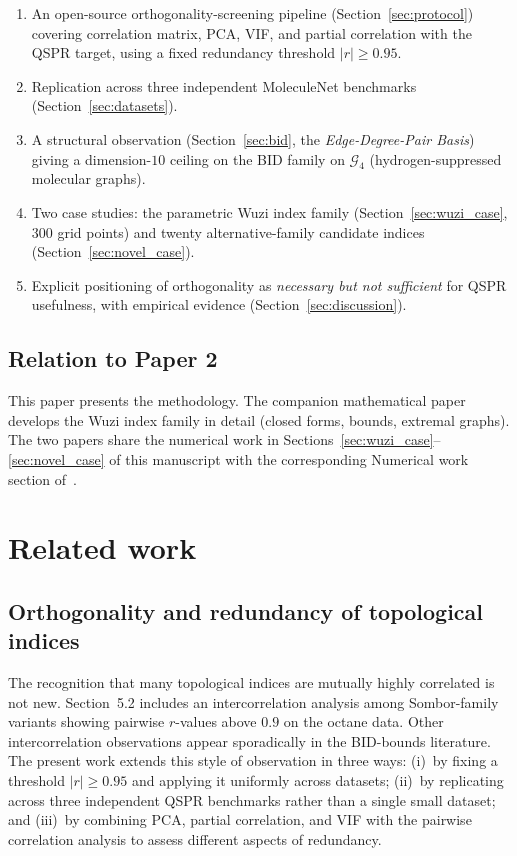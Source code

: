 \documentclass[11pt,a4paper]{article}
\theoremstyle{definition}
\begin{document}
\begin{enumerate}[label=(\arabic*)]
\item An open-source orthogonality-screening pipeline
(Section~\ref{sec:protocol}) covering correlation matrix,
PCA, VIF, and partial correlation with the QSPR target, using
a fixed redundancy threshold $|r|\ge 0.95$.
\item Replication across three independent MoleculeNet
benchmarks (Section~\ref{sec:datasets}).
\item A structural observation (Section~\ref{sec:bid}, the
\emph{Edge-Degree-Pair Basis}) giving a dimension-$10$ ceiling on
the BID family on $\mathcal{G}_4$ (hydrogen-suppressed molecular
graphs).
\item Two case studies: the parametric Wuzi index family
(Section~\ref{sec:wuzi_case}, $300$ grid points) and twenty
alternative-family candidate indices
(Section~\ref{sec:novel_case}).
\item Explicit positioning of orthogonality as \emph{necessary but
not sufficient} for QSPR usefulness, with empirical evidence
(Section~\ref{sec:discussion}).
\end{enumerate}

\subsection{Relation to Paper 2}
This paper presents the methodology. The companion mathematical
paper~\cite{Paper2_Wuzi} develops the Wuzi index family in detail
(closed forms, bounds, extremal graphs). The two papers share the
numerical work in Sections~\ref{sec:wuzi_case}--\ref{sec:novel_case}
of this manuscript with the corresponding Numerical work section
of~\cite{Paper2_Wuzi}.

\section{Related work}\label{sec:related}

\subsection{Orthogonality and redundancy of topological indices}

The recognition that many topological indices are mutually highly
correlated is not new. \cite{MovahediGutmanRedzepovicFurtula2026}
Section~5.2 includes an intercorrelation analysis among
Sombor-family variants showing pairwise $r$-values above $0.9$ on
the octane data. Other intercorrelation observations appear
sporadically in the BID-bounds literature. The present work
extends this style of observation in three ways: (i)~by fixing a
threshold $|r|\ge 0.95$ and applying it uniformly across datasets;
(ii)~by replicating across three independent QSPR benchmarks rather
than a single small dataset; and (iii)~by combining
PCA, partial correlation, and VIF with the pairwise correlation
analysis to assess different aspects of redundancy.
\end{document}
